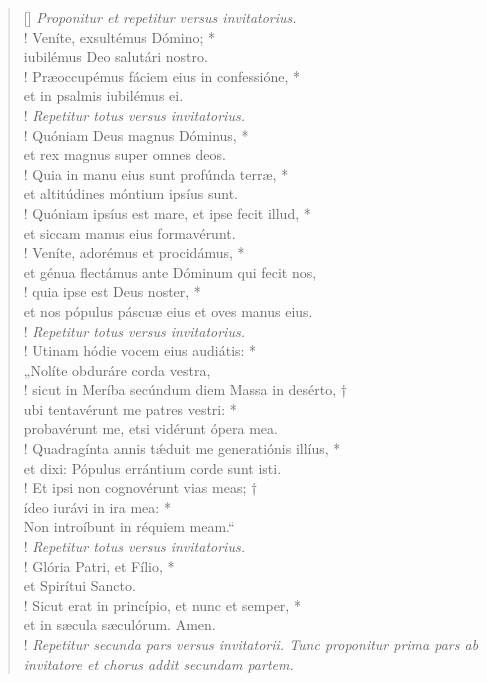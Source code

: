 \begin{verse}[\versewidth]
\textit{Proponitur et repetitur versus invitatorius.}\\!
Veníte, exsultémus Dómino; *\\
iubilémus Deo salutári nostro.\\!
Præoccupémus fáciem eius in confessióne, *\\
et in psalmis iubilémus ei.\\!
\textit{Repetitur totus versus invitatorius.}\\!
\vin Quóniam Deus magnus Dóminus, *\\
\vin et rex magnus super omnes deos.\\!
\vin Quia in manu eius sunt profúnda terræ, *\\
\vin et altitúdines móntium ipsíus sunt.\\!
Quóniam ipsíus est mare, et ipse fecit illud, *\\
et siccam manus eius formavérunt.\\!
Veníte, adorémus et procidámus, *\\
et génua flectámus ante Dóminum qui fecit nos,\\!
quia ipse est Deus noster, *\\
et nos pópulus páscuæ eius et oves manus eius.\\!
\textit{Repetitur totus versus invitatorius.}\\!
\vin Utinam hódie vocem eius audiátis: *\\
\vin „Nolíte obduráre corda vestra,\\!
\vin sicut in Meríba secúndum diem Massa in desérto, †\\
\vin ubi tentavérunt me patres vestri: *\\
\vin probavérunt me, etsi vidérunt ópera mea.\\!
Quadragínta annis t\'{æ}duit me generatiónis illíus, *\\
et dixi: Pópulus errántium corde sunt isti.\\!
Et ipsi non cognovérunt vias meas; †\\
ídeo iurávi in ira mea: *\\
Non introíbunt in réquiem meam.“\\!
\textit{Repetitur totus versus invitatorius.}\\!
\vin Glória Patri, et Fílio, *\\
\vin et Spirítui Sancto.\\!
\vin Sicut erat in princípio, et nunc et semper, *\\
\vin et in sæcula sæculórum. Amen.\\!
\textit{Repetitur secunda pars versus invitatorii. Tunc proponitur prima pars ab invitatore et chorus addit secundam partem.}\\
\end{verse}
\vspace{1cm}


